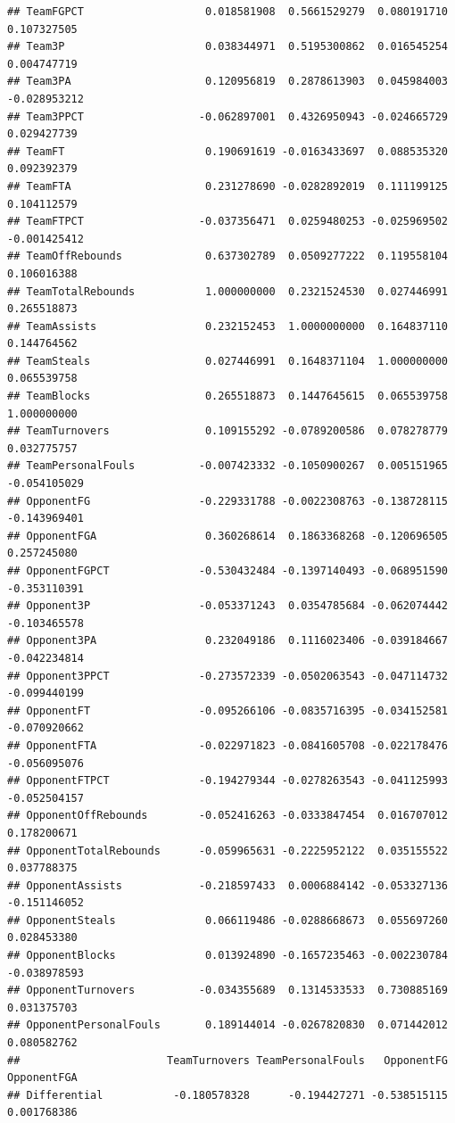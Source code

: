 \documentclass[
]{book}
\begin{document}
\begin{verbatim}
## TeamFGPCT                   0.018581908  0.5661529279  0.080191710  0.107327505
## Team3P                      0.038344971  0.5195300862  0.016545254  0.004747719
## Team3PA                     0.120956819  0.2878613903  0.045984003 -0.028953212
## Team3PPCT                  -0.062897001  0.4326950943 -0.024665729  0.029427739
## TeamFT                      0.190691619 -0.0163433697  0.088535320  0.092392379
## TeamFTA                     0.231278690 -0.0282892019  0.111199125  0.104112579
## TeamFTPCT                  -0.037356471  0.0259480253 -0.025969502 -0.001425412
## TeamOffRebounds             0.637302789  0.0509277222  0.119558104  0.106016388
## TeamTotalRebounds           1.000000000  0.2321524530  0.027446991  0.265518873
## TeamAssists                 0.232152453  1.0000000000  0.164837110  0.144764562
## TeamSteals                  0.027446991  0.1648371104  1.000000000  0.065539758
## TeamBlocks                  0.265518873  0.1447645615  0.065539758  1.000000000
## TeamTurnovers               0.109155292 -0.0789200586  0.078278779  0.032775757
## TeamPersonalFouls          -0.007423332 -0.1050900267  0.005151965 -0.054105029
## OpponentFG                 -0.229331788 -0.0022308763 -0.138728115 -0.143969401
## OpponentFGA                 0.360268614  0.1863368268 -0.120696505  0.257245080
## OpponentFGPCT              -0.530432484 -0.1397140493 -0.068951590 -0.353110391
## Opponent3P                 -0.053371243  0.0354785684 -0.062074442 -0.103465578
## Opponent3PA                 0.232049186  0.1116023406 -0.039184667 -0.042234814
## Opponent3PPCT              -0.273572339 -0.0502063543 -0.047114732 -0.099440199
## OpponentFT                 -0.095266106 -0.0835716395 -0.034152581 -0.070920662
## OpponentFTA                -0.022971823 -0.0841605708 -0.022178476 -0.056095076
## OpponentFTPCT              -0.194279344 -0.0278263543 -0.041125993 -0.052504157
## OpponentOffRebounds        -0.052416263 -0.0333847454  0.016707012  0.178200671
## OpponentTotalRebounds      -0.059965631 -0.2225952122  0.035155522  0.037788375
## OpponentAssists            -0.218597433  0.0006884142 -0.053327136 -0.151146052
## OpponentSteals              0.066119486 -0.0288668673  0.055697260  0.028453380
## OpponentBlocks              0.013924890 -0.1657235463 -0.002230784 -0.038978593
## OpponentTurnovers          -0.034355689  0.1314533533  0.730885169  0.031375703
## OpponentPersonalFouls       0.189144014 -0.0267820830  0.071442012  0.080582762
##                       TeamTurnovers TeamPersonalFouls   OpponentFG  OpponentFGA
## Differential           -0.180578328      -0.194427271 -0.538515115  0.001768386

\end{verbatim}
\end{document}
